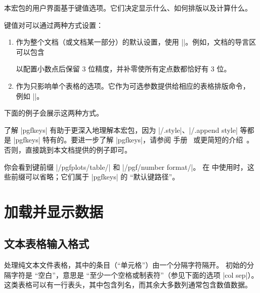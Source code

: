 \documentclass[a4paper,doc2]{ltxdoc}
\begin{document}
\begin{command}{\pgfplotstableset{}}
    本宏包的用户界面基于键值选项。它们决定显示什么、如何排版以及计算什么。

    键值对可以通过两种方式设置：
    \begin{enumerate}
        \item 作为整个文档（或文档某一部分）的默认设置，使用
            |\pgfplotstableset|。例如，文档的导言区可以包含
\begin{codeexample}
\end{codeexample}
            以配置小数点后保留 $3$ 位精度，并补零使所有定点数都恰好有 $3$ 位。
        \item 作为只影响单个表格的选项。它作为可选参数提供给相应的表格排版命令，
            例如 |\pgfplotstabletypeset|。
    \end{enumerate}
    下面的例子会展示这两种方式。

    了解 |pgfkeys| 有助于更深入地理解本宏包，因为 |/.style|、|/.append style|
    等都是 |pgfkeys| 特有的。要进一步了解 |pgfkeys|，请参阅
    \PGF{} 手册~\cite[Section ``pgfkeys'']{tikz} 或更简短的介绍~\cite{keyvalintro}。
    否则，直接跳到本文档提供的例子即可。

    你会看到键前缀 |/pgfplots/table/| 和 |/pgf/number format/|。
    在 \PGFPlotstable{} 中使用时，这些前缀可以省略；它们属于 |pgfkeys| 的
    ``默认键路径''。
\end{command}


\section{加载并显示数据}

\subsection{文本表格输入格式}

\PGFPlotstable{} 处理纯文本文件表格，其中的条目（``单元格''）由一个分隔字符隔开。
初始的分隔字符是 ``空白''，意思是 ``至少一个空格或制表符''（参见下面的选项
|col sep|）。这类表格可以有一行表头，其中包含列名，而其余大多数列通常包含数值数据。
\end{document}
